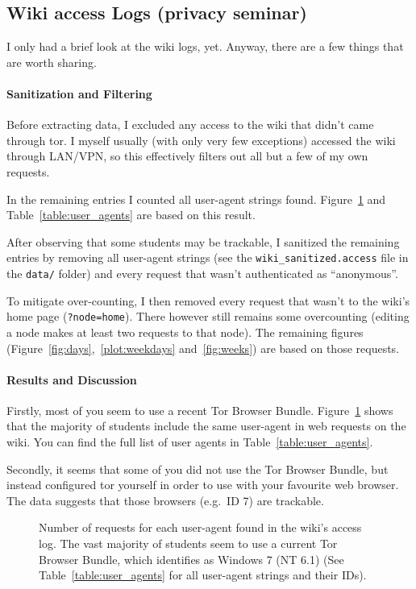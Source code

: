 \documentclass[twocolumn, a4paper, 10pt]{article}
\begin{document}
\subsection*{Wiki access Logs (privacy seminar)}
I only had a brief look at the wiki logs, yet. Anyway, there are a few things that are worth sharing. 

\paragraph{Sanitization and Filtering} 
Before extracting data, I excluded any access to the wiki that didn't came through tor. I myself usually (with only very few exceptions) accessed the wiki through LAN/VPN, so this effectively filters out all but a few of my own requests. 

In the remaining entries I counted all user-agent strings found. Figure~\ref{fig:user_agents} and Table~\ref{table:user_agents} are based on this result.

After observing that some students may be trackable, I sanitized the remaining entries by removing all user-agent strings (see the \texttt{wiki\_sanitized.access} file in the \texttt{data/} folder) and every request that wasn't authenticated as ``anonymous''.

To mitigate over-counting, I then removed every request that wasn't to the wiki's home page (\texttt{?node=home}). There however still remains some overcounting (editing a node makes at least two requests to that node). The remaining figures (Figure~\ref{fig:days},~\ref{plot:weekdays} and~\ref{fig:weeks}) are based on those requests.

\paragraph{Results and Discussion}
Firstly, most of you seem to use a recent Tor Browser Bundle. Figure~\ref{fig:user_agents} shows that the majority of students include the same user-agent in web requests on the wiki. You can find the full list of user agents in Table~\ref{table:user_agents}. 

Secondly, it seems that some of you did not use the Tor Browser Bundle, but instead configured tor yourself in order to use with your favourite web browser. The data suggests that those browsers (e.g.\ ID 7) are trackable. 


\begin{figure}
	
	\caption{Number of requests for each user-agent found in the wiki's access log. The vast majority of students seem to use a current Tor Browser Bundle, which identifies as Windows 7 (NT 6.1) (See Table~\ref{table:user_agents} for all user-agent strings and their IDs).}
	\label{fig:user_agents}
\end{figure}
\end{document}
